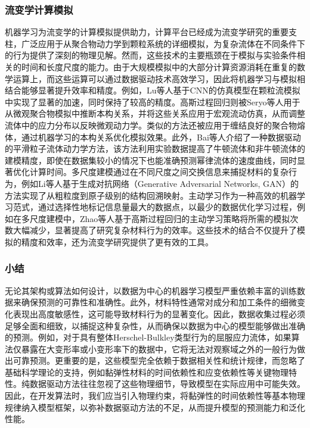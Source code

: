 \subsubsection{流变学计算模拟}
机器学习为流变学的计算模拟提供助力，计算平台已经成为流变学研究的重要支柱，广泛应用于从聚合物动力学到颗粒系统的详细模拟，为复杂流体在不同条件下的行为提供了深刻的物理见解。然而，这些技术的主要瓶颈在于模拟与实验条件相关的时间和长度尺度的能力。由于大规模模拟中的大部分计算资源消耗在重复的数学运算上，而这些运算可以通过数据驱动技术高效学习，因此将机器学习与模拟相结合能够显著提升效率和精度。例如，Lu等人基于CNN的仿真模型在颗粒流模拟中实现了显著的加速，同时保持了较高的精度\cite{lu2021machine}。高斯过程回归则被Seryo等人用于从微观聚合物模拟中推断本构关系，并将这些关系应用于宏观流动仿真，从而调整流体中的应力分布以反映微观动力学\cite{seryoLearningConstitutiveRelation2020}。类似的方法还被应用于缠结良好的聚合物熔体，通过机器学习的本构关系优化模拟效果。此外，Bai等人介绍了一种数据驱动的平滑粒子流体动力学方法，该方法利用实验数据提高了牛顿流体和非牛顿流体的建模精度，即使在数据集较小的情况下也能准确预测幂律流体的速度曲线，同时显著优化计算时间\cite{baiDatadrivenSmoothedParticle2021}。多尺度建模通过在不同尺度之间交换信息来捕捉材料的复杂行为，例如Li等人基于生成对抗网络（Generative Adversarial Networks, GAN）的方法实现了从粗粒度到原子级别的结构回溯映射\cite{liBackmappingCoarsegrainedMacromolecules2020}。主动学习作为一种高效的机器学习范式，通过选择性地标记信息量最大的数据点，以最少的数据优化学习过程，例如在多尺度建模中，Zhao等人基于高斯过程回归的主动学习策略将所需的模拟次数大幅减少，显著提高了研究复杂材料行为的效率\cite{zhaoActiveLearningConstitutive2018}。这些技术的结合不仅提升了模拟的精度和效率，还为流变学研究提供了更有效的工具。

\subsubsection{小结}
无论其架构或算法如何设计，以数据为中心的机器学习模型严重依赖丰富的训练数据来确保预测的可靠性和准确性。此外，材料特性通常对成分和加工条件的细微变化表现出高度敏感性，这可能导致材料行为的显著变化。因此，数据收集过程必须足够全面和细致，以捕捉这种复杂性，从而确保以数据为中心的模型能够做出准确的预测。例如，对于具有整体Herschel-Bulkley类型行为的屈服应力流体，如果算法仅暴露在大变形率或小变形率下的数据中，它将无法对观察域之外的一般行为做出可靠预测\cite{mangalDatadrivenTechniquesRheology2025,saadatRheologistsGuidelineDatadriven2023,reyesLearningUnknownPhysics2021}。更重要的是，这些模型完全依赖于数据相关性和统计规律，而忽略了基础科学理论的支持，例如黏弹性材料的时间依赖性和应变依赖性等关键物理特性。纯数据驱动方法往往忽视了这些物理细节，导致模型在实际应用中可能失效。因此，在开发算法时，我们应当引入物理约束，将黏弹性的时间依赖性等基本物理规律纳入模型框架，以弥补数据驱动方法的不足，从而提升模型的预测能力和泛化性能。
